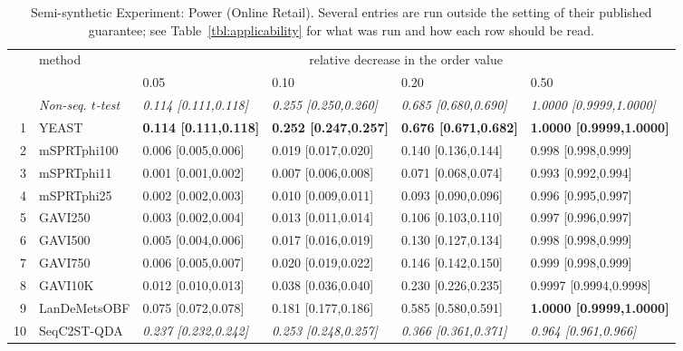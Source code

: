 \begin{table}[ht]
    \caption{Semi-synthetic Experiment: Power (Online Retail). Several entries are run outside the setting of their published guarantee; see Table~\ref{tbl:applicability} for what was run and how each row should be read.}\label{tbl:semi-synthetic-power}
    \centering
    \begin{footnotesize}
    \setlength{\tabcolsep}{2pt}
\begin{tabular}{rlllll}
  \hline
 & method & \multicolumn{4}{c}{relative decrease in the order value}\\
 &  & 0.05 & 0.10 & 0.20 & 0.50\\
  \hline
 & \textit{Non-seq. $t$-test} & \textit{0.114 [0.111,0.118]} & \textit{0.255 [0.250,0.260]} & \textit{0.685 [0.680,0.690]} & \textit{1.0000 [0.9999,1.0000]} \\
  1 & YEAST & \textbf{0.114 [0.111,0.118]} & \textbf{0.252 [0.247,0.257]} & \textbf{0.676 [0.671,0.682]} & \textbf{1.0000 [0.9999,1.0000]} \\
  2 & mSPRTphi100 & 0.006 [0.005,0.006] & 0.019 [0.017,0.020] & 0.140 [0.136,0.144] & 0.998 [0.998,0.999] \\
  3 & mSPRTphi11 & 0.001 [0.001,0.002] & 0.007 [0.006,0.008] & 0.071 [0.068,0.074] & 0.993 [0.992,0.994] \\
  4 & mSPRTphi25 & 0.002 [0.002,0.003] & 0.010 [0.009,0.011] & 0.093 [0.090,0.096] & 0.996 [0.995,0.997] \\
  5 & GAVI250 & 0.003 [0.002,0.004] & 0.013 [0.011,0.014] & 0.106 [0.103,0.110] & 0.997 [0.996,0.997] \\
  6 & GAVI500 & 0.005 [0.004,0.006] & 0.017 [0.016,0.019] & 0.130 [0.127,0.134] & 0.998 [0.998,0.999] \\
  7 & GAVI750 & 0.006 [0.005,0.007] & 0.020 [0.019,0.022] & 0.146 [0.142,0.150] & 0.999 [0.998,0.999] \\
  8 & GAVI10K & 0.012 [0.010,0.013] & 0.038 [0.036,0.040] & 0.230 [0.226,0.235] & 0.9997 [0.9994,0.9998] \\
  9 & LanDeMetsOBF & 0.075 [0.072,0.078] & 0.181 [0.177,0.186] & 0.585 [0.580,0.591] & \textbf{1.0000 [0.9999,1.0000]} \\
  10 & SeqC2ST-QDA & \textit{0.237 [0.232,0.242]} & \textit{0.253 [0.248,0.257]} & \textit{0.366 [0.361,0.371]} & \textit{0.964 [0.961,0.966]} \\
   \hline
\end{tabular}
\end{footnotesize}
\end{table}
